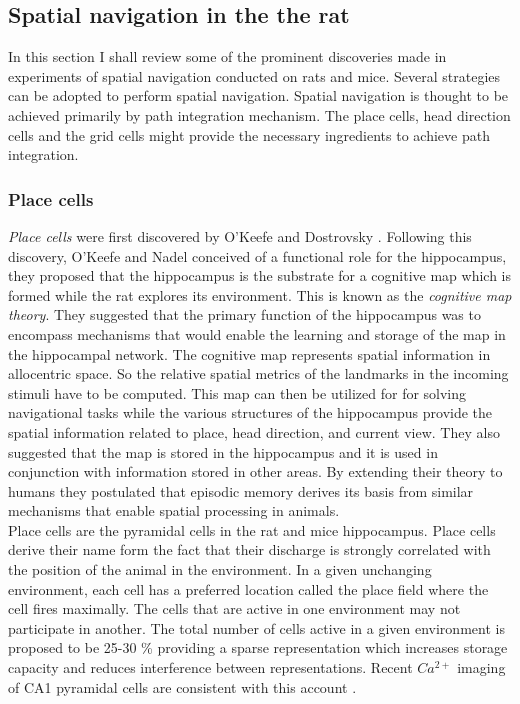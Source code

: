 \subsection{Spatial navigation in the the rat}
In this section I shall review some of the prominent discoveries made in experiments of spatial navigation conducted on rats and mice. Several strategies can be adopted to perform spatial navigation. Spatial navigation is thought to be achieved primarily by path integration mechanism. The place cells, head direction cells and the grid cells might provide the necessary ingredients to achieve path integration. 

\subsubsection{Place cells}
\label{placeCells}
 \emph{Place cells} were first discovered by O'Keefe and Dostrovsky \cite{O'Keefe1971a}. Following this discovery, O'Keefe and Nadel \cite{Street}  conceived of a functional role for the hippocampus, they proposed that the hippocampus is the substrate for a cognitive map which is formed while the rat explores its environment. This is known as the \emph{cognitive map theory}. They suggested that the primary function of the hippocampus was to encompass mechanisms that would enable the learning and storage of the map in the hippocampal network. The cognitive map represents spatial information in allocentric space. So the relative spatial metrics of the landmarks in the incoming stimuli have to be computed. This map can then be utilized for for solving navigational tasks while the various structures of the hippocampus provide the spatial information related to place, head direction, and current view. They also suggested that the map is stored in the hippocampus and it is used in conjunction with information stored in other areas. By extending their theory to humans they postulated that episodic memory derives its basis from similar mechanisms that enable spatial processing in animals.\\ 
Place cells are the  pyramidal cells in the rat and mice hippocampus. Place cells derive their name form the fact that their discharge is strongly correlated with the position of the animal in the environment. In a given unchanging environment, each cell has a preferred location called the place field where the cell fires maximally.  The cells that are active in one environment may not participate in another. The total number of cells active in a given environment is proposed to be 25-30 \% providing a sparse representation which increases storage capacity and reduces interference between representations\cite{Marr2007, Wilson1993a}. Recent $Ca^{2+}$ imaging of CA1 pyramidal cells are consistent with this account \cite{Ziv2013}.
